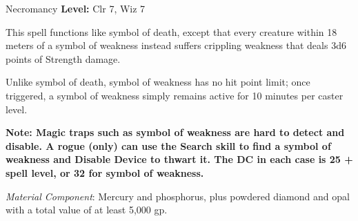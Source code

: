 {Necromancy}
{
	\textbf{Level:}
	Clr 7, Wiz 7\\
}
{
	This spell functions like symbol of death, except that every creature within 18 meters of a symbol of weakness instead suffers crippling weakness that deals 3d6 points of Strength damage.

	Unlike symbol of death, symbol of weakness has no hit point limit; once triggered, a symbol of weakness simply remains active for 10 minutes per caster level.

	\textbf{Note: Magic traps such as symbol of weakness are hard to detect and disable. A rogue (only) can use the Search skill to find a symbol of weakness and Disable Device to thwart it. The DC in each case is 25 + spell level, or 32 for symbol of weakness.}

	\textit{Material Component}:
	Mercury and phosphorus, plus powdered diamond and opal with a total value of at least 5,000 gp.

}
